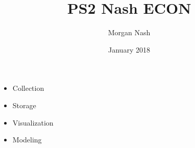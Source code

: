 \documentclass{article}
\title{PS2 Nash ECON}
\author{Morgan Nash}
\date{January 2018}
\begin{document}
\maketitle

\begin{itemize}
    \item Collection
    \item Storage
    \item Visualization
    \item Modeling
\end{itemize}
\end{document}
